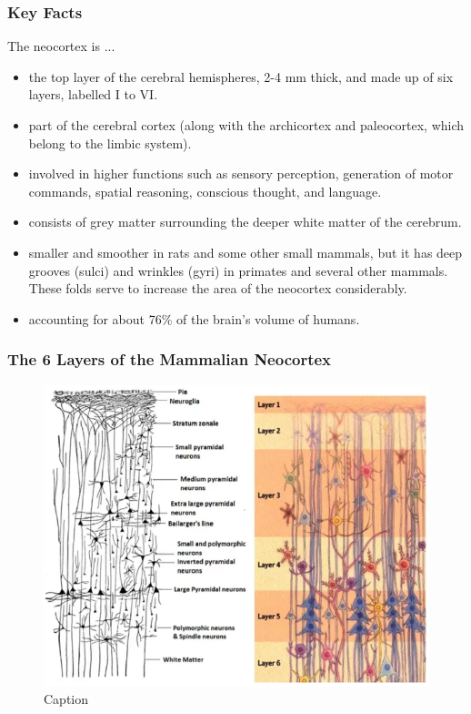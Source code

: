 \documentclass[main]{subfiles}
\begin{document}
\subsubsection{Key Facts}
The neocortex is ...
\begin{itemize}
    \item the top layer of the cerebral hemispheres, 2-4 mm thick, and made up of six layers, labelled I to VI.
    \item part of the cerebral cortex (along with the archicortex and paleocortex, which belong to the limbic system).
    \item involved in higher functions such as sensory perception, generation of motor commands, spatial reasoning, conscious thought, and language.
    \item consists of grey matter surrounding the deeper white matter of the cerebrum.
    \item smaller and smoother in rats and some other small mammals, but it has deep grooves (sulci) and wrinkles (gyri) in primates and several other mammals. These folds serve to increase the area of the neocortex considerably.
    \item accounting for about 76\% of the brain's volume of humans.
\end{itemize}

\subsubsection{The 6 Layers of the Mammalian Neocortex}
\begin{figure}[H]
    \centering
    \includegraphics[width=0.8\linewidth]{01_Introduction/figures/layers_illustrated.png}
    \caption{Caption}
    \label{fig:basalandcerebellum}
\end{figure}
\end{document}
